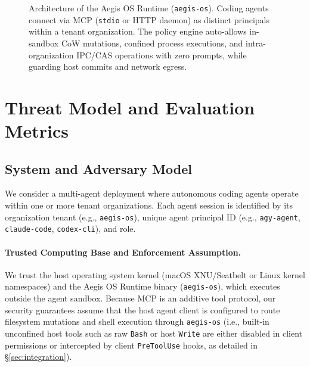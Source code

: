 \documentclass[10pt,twocolumn]{article}
\begin{document}
\begin{figure}[!t]
{%
}
\caption{Architecture of the Aegis OS Runtime (\texttt{aegis-os}). Coding agents connect via MCP (\texttt{stdio} or HTTP daemon) as distinct principals within a tenant organization. The policy engine auto-allows in-sandbox CoW mutations, confined process executions, and intra-organization IPC/CAS operations with zero prompts, while guarding host commits and network egress.}
\label{fig:arch}
\end{figure}

\section{Threat Model and Evaluation Metrics}
\label{sec:threat}

\subsection{System and Adversary Model}

We consider a multi-agent deployment where autonomous coding agents operate within one or more tenant organizations. Each agent session is identified by its organization tenant (e.g., \texttt{aegis-os}), unique agent principal ID (e.g., \texttt{agy-agent}, \texttt{claude-code}, \texttt{codex-cli}), and role.

\paragraph{Trusted Computing Base and Enforcement Assumption.} We trust the host operating system kernel (macOS XNU/Seatbelt or Linux kernel namespaces) and the Aegis OS Runtime binary (\texttt{aegis-os}), which executes outside the agent sandbox. Because MCP is an additive tool protocol, our security guarantees assume that the host agent client is configured to route filesystem mutations and shell execution through \texttt{aegis-os} (i.e., built-in unconfined host tools such as raw \texttt{Bash} or host \texttt{Write} are either disabled in client permissions or intercepted by client \texttt{PreToolUse} hooks, as detailed in \S\ref{sec:integration}).
\end{document}
